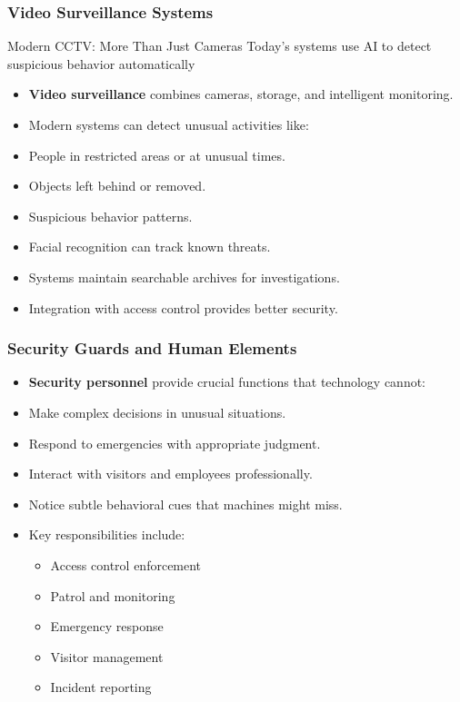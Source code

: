 \documentclass{beamer}
\begin{document}
\begin{frame}
    \frametitle{Video Surveillance Systems}
    \begin{block}{Modern CCTV: More Than Just Cameras}
        Today's systems use AI to detect suspicious behavior automatically
    \end{block}
    \begin{itemize}
        \item \textbf{Video surveillance} combines cameras, storage, and intelligent monitoring.
        \item Modern systems can detect unusual activities like:
        \item People in restricted areas or at unusual times.
        \item Objects left behind or removed.
        \item Suspicious behavior patterns.
        \item Facial recognition can track known threats.
        \item Systems maintain searchable archives for investigations.
        \item Integration with access control provides better security.
    \end{itemize}
\end{frame}

\begin{frame}
    \frametitle{Security Guards and Human Elements}
    \begin{itemize}
        \item \textbf{Security personnel} provide crucial functions that technology cannot:
        \item Make complex decisions in unusual situations.
        \item Respond to emergencies with appropriate judgment.
        \item Interact with visitors and employees professionally.
        \item Notice subtle behavioral cues that machines might miss.
        \item Key responsibilities include:
            \begin{itemize}
                \item Access control enforcement
                \item Patrol and monitoring
                \item Emergency response
                \item Visitor management
                \item Incident reporting
            \end{itemize}
    \end{itemize}
\end{frame}
\end{document}
